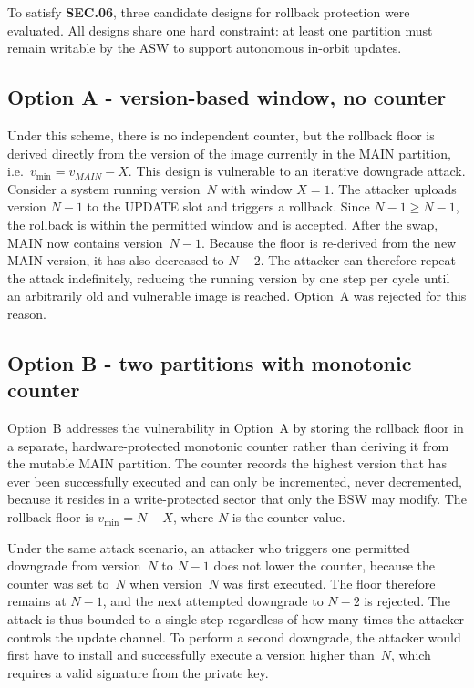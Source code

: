 To satisfy \textbf{SEC.06}, three candidate designs for rollback protection were evaluated. All designs share one hard constraint: at least one partition must remain writable by the ASW to support autonomous in-orbit updates.

\subsection{Option A - version-based window, no counter}
\label{sub:rollback-a}

Under this scheme, there is no independent counter, but the rollback floor is derived directly from the version of the image currently in the MAIN partition, i.e.\ $v_{\min} = v_{MAIN} - X$. This design is vulnerable to an iterative downgrade attack. Consider a system running version~$N$ with window $X = 1$. The attacker uploads version $N-1$ to the UPDATE slot and triggers a rollback. Since $N-1 \geq N - 1$, the rollback is within the permitted window and is accepted. After the swap, MAIN now contains version~$N-1$. Because the floor is re-derived from the new MAIN version, it has also decreased to $N-2$. The attacker can therefore repeat the attack indefinitely, reducing the running version by one step per cycle until an arbitrarily old and vulnerable image is reached. Option~A was rejected for this reason.

\subsection{Option B - two partitions with monotonic counter}
\label{sub:rollback-b}

Option~B addresses the vulnerability in Option~A by storing the rollback floor in a separate, hardware-protected monotonic counter rather than deriving it from the mutable MAIN partition. The counter records the highest version that has ever been successfully executed and can only be incremented, never decremented, because it resides in a write-protected sector that only the BSW may modify. The rollback floor is $v_{\min} = N - X$, where $N$ is the counter value.

Under the same attack scenario, an attacker who triggers one permitted downgrade from version~$N$ to $N-1$ does not lower the counter, because the counter was set to~$N$ when version~$N$ was first executed. The floor therefore remains at $N-1$, and the next attempted downgrade to $N-2$ is rejected. The attack is thus bounded to a single step regardless of how many times the attacker controls the update channel. To perform a second downgrade, the attacker would first have to install and successfully execute a version higher than~$N$, which requires a valid signature from the private key.

